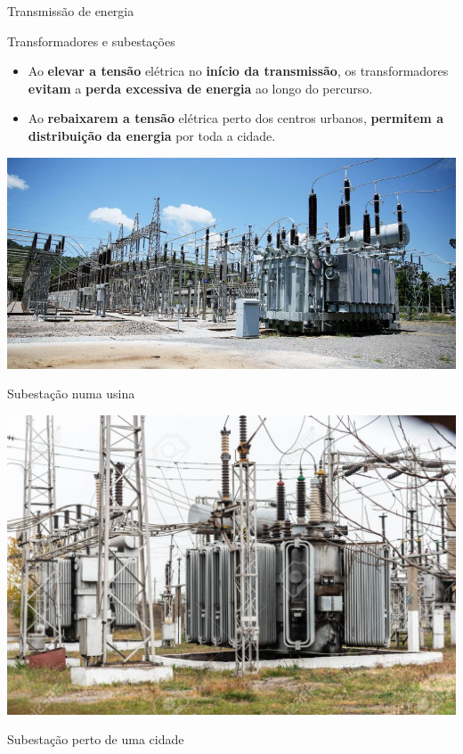 \begin{frame}{Transmissão de energia}
	\begin{block}{Transformadores e subestações}
		\begin{itemize}
			\item Ao \textbf{elevar a tensão }elétrica no \textbf{início da transmissão}, os transformadores \textbf{evitam }a\textbf{ perda excessiva de energia }ao longo do percurso.
			\item Ao \textbf{rebaixarem a tensão }elétrica perto dos centros urbanos, \textbf{permitem a distribuição da energia }por toda a cidade.
		\end{itemize}
	\end{block}


	\begin{minipage}{0.49\linewidth}
		\centering
		\includegraphics[width=\linewidth]{Figuras/Ch03/fig13}

		Subestação numa usina
	\end{minipage}
	\hfill
	\begin{minipage}{0.49\linewidth}
		\centering
		\includegraphics[width=\linewidth]{Figuras/Ch03/fig14}

		Subestação perto de uma cidade
	\end{minipage}
\end{frame}


